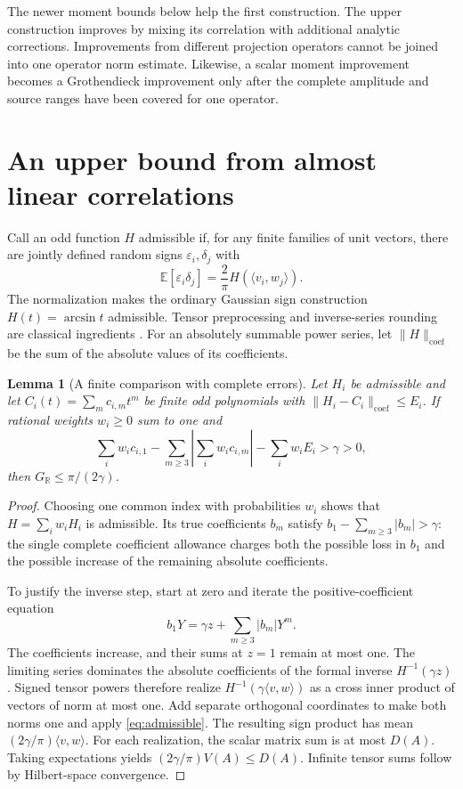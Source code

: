 \documentclass[11pt]{article}
\newtheorem{lemma}{Lemma}
\newcommand{\E}{\mathbb E}
\newcommand{\R}{\mathbb R}
\newcommand{\GR}{G_{\R}}
\newcommand{\ip}[2]{\langle #1,#2\rangle}
\newcommand{\cnorm}[1]{\lVert #1\rVert_{\mathrm{coef}}}
\begin{document}
The newer moment bounds below help the first construction. The upper construction improves by mixing its correlation with additional analytic corrections. Improvements from different projection operators cannot be joined into one operator norm estimate. Likewise, a scalar moment improvement becomes a Grothendieck improvement only after the complete amplitude and source ranges have been covered for one operator.

\section{An upper bound from almost linear correlations}
Call an odd function $H$ admissible if, for any finite families of unit vectors, there are jointly defined random signs $\varepsilon_i,\delta_j$ with
\begin{equation}\label{eq:admissible}
 \E[\varepsilon_i\delta_j]
 =\frac2\pi H(\ip{v_i}{w_j}).
\end{equation}
The normalization makes the ordinary Gaussian sign construction $H(t)=\arcsin t$ admissible. Tensor preprocessing and inverse-series rounding are classical ingredients \cite{Krivine,BMMN,NR}. For an absolutely summable power series, let $\cnorm{H}$ be the sum of the absolute values of its coefficients.

\begin{lemma}[A finite comparison with complete errors]\label{lem:upper}
Let $H_i$ be admissible and let $C_i(t)=\sum_m c_{i,m}t^m$ be finite odd polynomials with $\cnorm{H_i-C_i}\le E_i$. If rational weights $w_i\ge0$ sum to one and
\begin{equation}\label{eq:upper-margin}
 \sum_iw_ic_{i,1}
 -\sum_{m\ge3}\left|\sum_iw_ic_{i,m}\right|
 -\sum_iw_iE_i>\gamma>0,
\end{equation}
then $\GR\le\pi/(2\gamma)$.
\end{lemma}
\begin{proof}
Choosing one common index with probabilities $w_i$ shows that $H=\sum_iw_iH_i$ is admissible. Its true coefficients $b_m$ satisfy $b_1-\sum_{m\ge3}|b_m|>\gamma$: the single complete coefficient allowance charges both the possible loss in $b_1$ and the possible increase of the remaining absolute coefficients.

To justify the inverse step, start at zero and iterate the positive-coefficient equation
\begin{equation*}
 b_1Y=\gamma z+\sum_{m\ge3}|b_m|Y^m.
\end{equation*}
The coefficients increase, and their sums at $z=1$ remain at most one. The limiting series dominates the absolute coefficients of the formal inverse $H^{-1}(\gamma z)$. Signed tensor powers therefore realize $H^{-1}(\gamma\ip vw)$ as a cross inner product of vectors of norm at most one. Add separate orthogonal coordinates to make both norms one and apply \eqref{eq:admissible}. The resulting sign product has mean $(2\gamma/\pi)\ip vw$. For each realization, the scalar matrix sum is at most $D(A)$. Taking expectations yields $(2\gamma/\pi)V(A)\le D(A)$. Infinite tensor sums follow by Hilbert-space convergence.
\end{proof}
\end{document}
